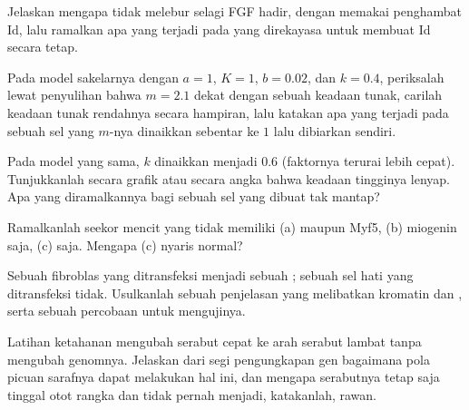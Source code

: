 \begin{exercise}[$\star\star$]\label{exo:b2:cell-differentiation:6}
Jelaskan mengapa  tidak melebur selagi FGF hadir, dengan memakai
penghambat Id, lalu ramalkan apa yang terjadi pada  yang
direkayasa untuk membuat Id secara tetap.
\end{exercise}

\begin{exercise}[$\star\star$]\label{exo:b2:cell-differentiation:7}
Pada model sakelarnya dengan $a = 1$, $K = 1$, $b = 0.02$, dan $k = 0.4$,
periksalah lewat penyulihan bahwa $m = 2.1$ dekat dengan sebuah keadaan
tunak, carilah keadaan tunak rendahnya secara hampiran, lalu katakan
apa yang terjadi pada sebuah sel yang $m$-nya dinaikkan sebentar ke $1$
lalu dibiarkan sendiri.
\end{exercise}

\begin{exercise}[$\star\star$]\label{exo:b2:cell-differentiation:8}
Pada model yang sama, $k$ dinaikkan menjadi $0.6$ (faktornya terurai
lebih cepat). Tunjukkanlah secara grafik atau secara angka bahwa
keadaan tingginya lenyap. Apa yang diramalkannya bagi sebuah sel yang
 dibuat tak mantap?
\end{exercise}

\begin{exercise}[$\star\star$]\label{exo:b2:cell-differentiation:9}
Ramalkanlah  seekor mencit yang tidak memiliki (a)  maupun
Myf5, (b) miogenin saja, (c)  saja. Mengapa (c) nyaris normal?
\end{exercise}

\begin{exercise}[$\star\star\star$]\label{exo:b2:cell-differentiation:10}
Sebuah fibroblas yang ditransfeksi  menjadi sebuah ; sebuah
sel hati yang ditransfeksi  tidak. Usulkanlah sebuah penjelasan
yang melibatkan kromatin dan , serta sebuah percobaan untuk
mengujinya.
\end{exercise}

\begin{exercise}[$\star\star\star$]\label{exo:b2:cell-differentiation:11}
Latihan ketahanan mengubah serabut cepat ke arah serabut lambat tanpa
mengubah genomnya. Jelaskan dari segi pengungkapan gen bagaimana pola
picuan sarafnya dapat melakukan hal ini, dan mengapa serabutnya tetap
saja tinggal otot rangka dan tidak pernah menjadi, katakanlah, rawan.
\end{exercise}

